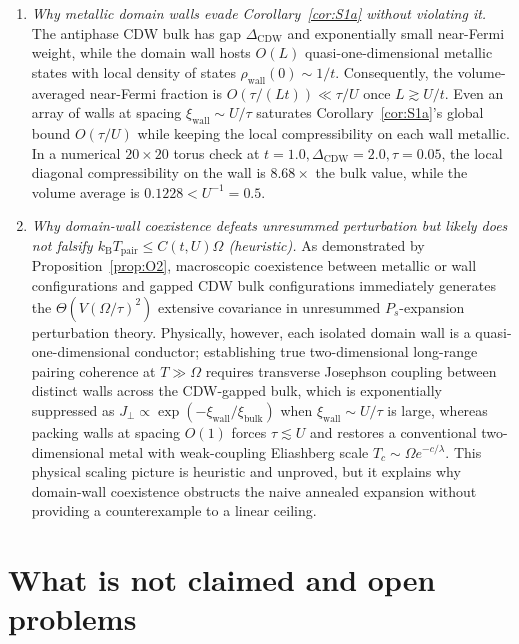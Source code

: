 \documentclass[11pt]{article}
\theoremstyle{definition}
\theoremstyle{remark}
\newcommand{\Tpair}{T_{\mathrm{pair}}}
\newcommand{\kB}{k_{\mathrm{B}}}
\begin{document}
\begin{enumerate}[label=(\arabic*),leftmargin=2.2em]
\item \emph{Why metallic domain walls evade Corollary~\ref{cor:S1a} without violating it.} The antiphase CDW bulk has gap $\Delta_{\mathrm{CDW}}$ and exponentially small near-Fermi weight, while the domain wall hosts $O(L)$ quasi-one-dimensional metallic states with local density of states $\rho_{\mathrm{wall}}(0) \sim 1/t$. Consequently, the volume-averaged near-Fermi fraction is $O(\tau/(Lt)) \ll \tau/U$ once $L \gtrsim U/t$. Even an array of walls at spacing $\xi_{\mathrm{wall}} \sim U/\tau$ saturates Corollary~\ref{cor:S1a}'s global bound $O(\tau/U)$ while keeping the local compressibility on each wall metallic. In a numerical $20\times 20$ torus check at $t=1.0, \Delta_{\mathrm{CDW}}=2.0, \tau=0.05$, the local diagonal compressibility on the wall is $8.68\times$ the bulk value, while the volume average is $0.1228 < U^{-1} = 0.5$.
\item \emph{Why domain-wall coexistence defeats unresummed perturbation but likely does not falsify $\kB \Tpair \le C(t,U)\Omega$ (heuristic).} As demonstrated by Proposition~\ref{prop:O2}, macroscopic coexistence between metallic or wall configurations and gapped CDW bulk configurations immediately generates the $\Theta(V(\Omega/\tau)^2)$ extensive covariance in unresummed $P_s$-expansion perturbation theory. Physically, however, each isolated domain wall is a quasi-one-dimensional conductor; establishing true two-dimensional long-range pairing coherence at $T \gg \Omega$ requires transverse Josephson coupling between distinct walls across the CDW-gapped bulk, which is exponentially suppressed as $J_\perp \propto \exp(-\xi_{\mathrm{wall}}/\xi_{\mathrm{bulk}})$ when $\xi_{\mathrm{wall}} \sim U/\tau$ is large, whereas packing walls at spacing $O(1)$ forces $\tau \lesssim U$ and restores a conventional two-dimensional metal with weak-coupling Eliashberg scale $T_c \sim \Omega e^{-c/\lambda}$. This physical scaling picture is heuristic and unproved, but it explains why domain-wall coexistence obstructs the naive annealed expansion without providing a counterexample to a linear ceiling.
\end{enumerate}

\section{What is not claimed and open problems}
\label{sec:limits}
\end{document}
